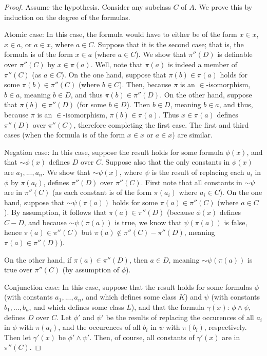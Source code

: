 \documentclass{article}
\newcommand*{\oldneg}{\mathord{\sim}}
\theoremstyle{definition}
\begin{document}
\begin{proof}
Assume the hypothesis. Consider any subclass $C$ of $A$. We prove this by induction on the degree of the formulas.

Atomic case: In this case, the formula would have to either be of the form $x\in x$, $x\in a$, or $a\in x$, where $a\in C$. 
Suppose that it is the second case; that is, the formula is of the form $x\in a$ (where $a\in C$). We show that 
$\pi''(D)$ is definable over $\pi''(C)$ by $x\in\pi(a)$. Well, note that $\pi(a)$ is indeed a member of 
$\pi''(C)$ (as $a\in C$). On the one hand, suppose that $\pi(b)\in\pi(a)$ holds for some $\pi(b)\in\pi''(C)$ (where $b\in C$). 
Then, because $\pi$ is an $\in$-isomorphism, $b\in a$, meaning $b\in D$, and thus $\pi(b)\in\pi''(D)$. On the other hand, 
suppose that $\pi(b)\in\pi''(D)$ (for some $b\in D$). Then $b\in D$, meaning $b\in a$, and thus, because $\pi$ is an 
$\in$-isomorphism, $\pi(b)\in\pi(a)$. Thus $x\in\pi(a)$ defines $\pi''(D)$ over $\pi''(C)$, therefore completing the first case. The first 
and third cases (when the formula is of the form $x\in x$ or $a\in x$) are similar.

Negation case: In this case, suppose the result holds for some formula $\phi(x)$, and that $\oldneg\phi(x)$ defines 
$D$ over $C$. Suppose also that the only constants in $\phi(x)$ are $a_1,...,a_n$. We show that 
$\oldneg\psi(x)$, where $\psi$ is the result of replacing each $a_i$ in $\phi$ by $\pi(a_i)$, defines 
$\pi''(D)$ over $\pi''(C)$. First note that all constants in $\oldneg\psi$ are in $\pi''(C)$ (as 
each constant is of the form $\pi(a_i)$ where $a_i\in C$). On the one hand, suppose that 
$\oldneg\psi(\pi(a))$ holds for some $\pi(a)\in\pi''(C)$ (where $a\in C$). By assumption, it follows that 
$\pi(a)\in\pi''(D)$ (because $\phi(x)$ defines $C-D$, and because $\oldneg\psi(\pi(a))$ is true, we know that 
$\psi(\pi(a))$ is false, hence $\pi(a)\in\pi''(C)$ but $\pi(a)\notin\pi''(C)-\pi''(D)$, meaning $\pi(a)\in\pi''(D)$).

On the other hand, if $\pi(a)\in\pi''(D)$, then $a\in D$, meaning 
$\oldneg\psi(\pi(a))$ is true over $\pi''(C)$ (by assumption of $\phi$).

Conjunction case: In this case, suppose that the result holds for some formulas $\phi$ (with constants $a_1,...,a_n$, and which 
defines some class $K$) and $\psi$
(with constants $b_1,...,b_n$, and which defines some class $L$), and that the formula
$\gamma(x)$: $\phi\wedge\psi$, defines $D$ over $C$. Let $\phi'$ and $\psi'$ be the results of replacing the occurences of all
$a_i$ in $\phi$ with $\pi(a_i)$, and the occurences of all $b_i$ in $\psi$ with $\pi(b_i)$, respectively. Then let 
$\gamma'(x)$ be $\phi'\wedge\psi'$. Then, of course, all constants of $\gamma'(x)$ are in $\pi''(C)$.


\end{proof}
\end{document}
